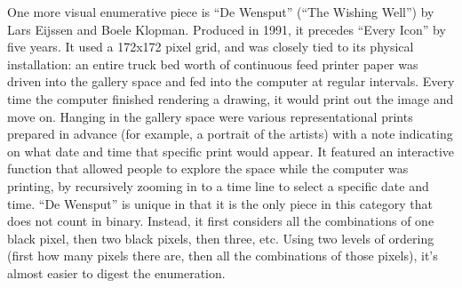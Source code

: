 \documentclass{thesis}
\begin{document}
	One more visual enumerative piece is ``De Wensput'' (``The Wishing Well'') by Lars Eijssen and Boele Klopman.\cite{remko_scha_every_2001} Produced in 1991, it precedes ``Every Icon'' by five years. It used a 172x172 pixel grid, and was closely tied to its physical installation: an entire truck bed worth of continuous feed printer paper was driven into the gallery space and fed into the computer at regular intervals. Every time the computer finished rendering a drawing, it would print out the image and move on. Hanging in the gallery space were various representational prints prepared in advance (for example, a portrait of the artists) with a note indicating on what date and time that specific print would appear. It featured an interactive function that allowed people to explore the space while the computer was printing, by recursively zooming in to a time line to select a specific date and time. ``De Wensput'' is unique in that it is the only piece in this category that does not count in binary. Instead, it first considers all the combinations of one black pixel, then two black pixels, then three, etc. Using two levels of ordering (first how many pixels there are, then all the combinations of those pixels), it's almost easier to digest the enumeration.
	
	\cite{michael_aschauer_8-bit_????}
	\cite{nattiez_music_1990}	
	\cite{tomczak_all_2009}
	\cite{tomczak_hardware-based_2009}
	\cite{alexander_christiaan_jacob_allrgb_2008}
	\cite{allan_mccollum_shapes_2006}
	\cite{jem_finer_longplayer_????}
	\cite{john_cage_as_????}
	\cite{paul_slocum_pi_2007}
	\cite{brian_whitman_eigenradio_2005}
	\cite{keith_f._lynch_converting_????}
	\cite{tom_johnson_liner_1999}
	\cite{christian_scheib_statics_????}
	
\end{document}
